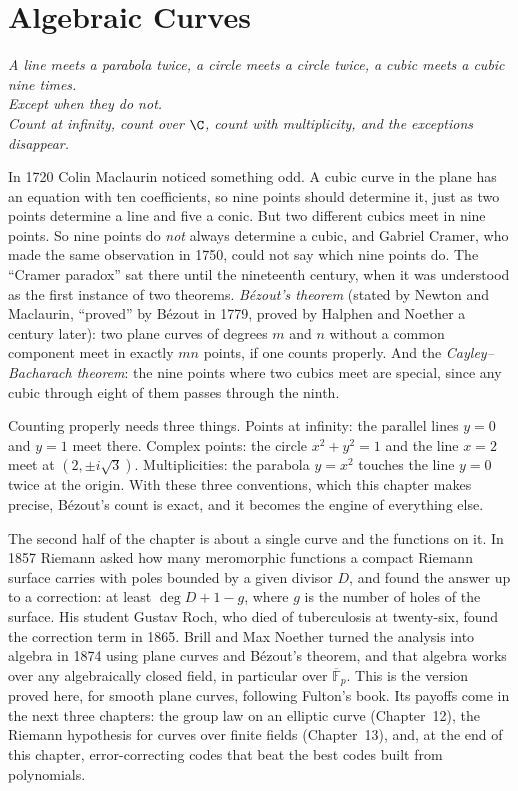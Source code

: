 \chapter{Algebraic Curves}
\begin{center}\itshape
A line meets a parabola twice, a circle meets a circle twice, a cubic meets a cubic nine times.\\
Except when they do not.\\
Count at infinity, count over $\C$, count with multiplicity, and the exceptions disappear.
\end{center}

In 1720 Colin Maclaurin noticed something odd. A cubic curve in the plane has an equation with ten coefficients, so nine points should
determine it, just as two points determine a line and five a conic. But two different cubics meet in nine points. So nine points do
\emph{not} always determine a cubic, and Gabriel Cramer, who made the same observation in 1750, could not say which nine points do.
The ``Cramer paradox'' sat there until the nineteenth century, when it was understood as the first instance of two theorems.
\emph{B\'ezout's theorem} (stated by Newton and Maclaurin, ``proved'' by B\'ezout in 1779, proved by Halphen and Noether a century later):
two plane curves of degrees $m$ and $n$ without a common component meet in exactly $mn$ points, if one counts properly. And the
\emph{Cayley--Bacharach theorem}: the nine points where two cubics meet are special, since any cubic through eight of them passes through
the ninth.

Counting properly needs three things. Points at infinity: the parallel lines $y=0$ and $y=1$ meet there. Complex points: the circle
$x^2+y^2=1$ and the line $x=2$ meet at $(2,\pm i\sqrt3)$. Multiplicities: the parabola $y=x^2$ touches the line $y=0$ twice at the
origin. With these three conventions, which this chapter makes precise, B\'ezout's count is exact, and it becomes the engine of
everything else.

The second half of the chapter is about a single curve and the functions on it. In 1857 Riemann asked how many meromorphic functions a
compact Riemann surface carries with poles bounded by a given divisor $D$, and found the answer up to a correction: at least
$\deg D+1-g$, where $g$ is the number of holes of the surface. His student Gustav Roch, who died of tuberculosis at twenty-six, found the
correction term in 1865. Brill and Max Noether turned the analysis into algebra in 1874 using plane curves and B\'ezout's theorem, and
that algebra works over any algebraically closed field, in particular over $\overline{\mathbb F}_p$. This is the version proved here,
for smooth plane curves, following Fulton's book. Its payoffs come in the next three chapters: the group law on an elliptic curve
(Chapter~12), the Riemann hypothesis for curves over finite fields (Chapter~13), and, at the end of this chapter, error-correcting codes
that beat the best codes built from polynomials.

